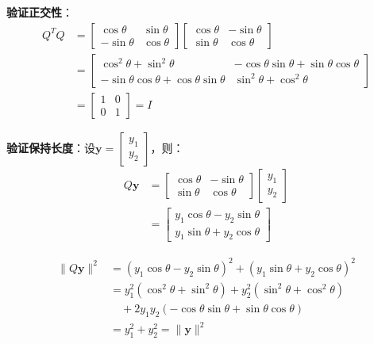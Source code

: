 \documentclass[12pt,a4paper]{article}
\begin{document}
\textbf{验证正交性}：
\begin{align}
Q^T Q &= \begin{bmatrix} \cos\theta & \sin\theta \\ -\sin\theta & \cos\theta \end{bmatrix} \begin{bmatrix} \cos\theta & -\sin\theta \\ \sin\theta & \cos\theta \end{bmatrix} \\
&= \begin{bmatrix} \cos^2\theta + \sin^2\theta & -\cos\theta\sin\theta + \sin\theta\cos\theta \\ -\sin\theta\cos\theta + \cos\theta\sin\theta & \sin^2\theta + \cos^2\theta \end{bmatrix} \\
&= \begin{bmatrix} 1 & 0 \\ 0 & 1 \end{bmatrix} = I
\end{align}

\textbf{验证保持长度}：设$\bm{y} = \begin{bmatrix} y_1 \\ y_2 \end{bmatrix}$，则：
\begin{align}
Q\bm{y} &= \begin{bmatrix} \cos\theta & -\sin\theta \\ \sin\theta & \cos\theta \end{bmatrix} \begin{bmatrix} y_1 \\ y_2 \end{bmatrix} \\
&= \begin{bmatrix} y_1\cos\theta - y_2\sin\theta \\ y_1\sin\theta + y_2\cos\theta \end{bmatrix}
\end{align}

\begin{align}
\|Q\bm{y}\|^2 &= (y_1\cos\theta - y_2\sin\theta)^2 + (y_1\sin\theta + y_2\cos\theta)^2 \\
&= y_1^2(\cos^2\theta + \sin^2\theta) + y_2^2(\sin^2\theta + \cos^2\theta) \\
&\quad + 2y_1 y_2(-\cos\theta\sin\theta + \sin\theta\cos\theta) \\
&= y_1^2 + y_2^2 = \|\bm{y}\|^2
\end{align}
\end{document}

